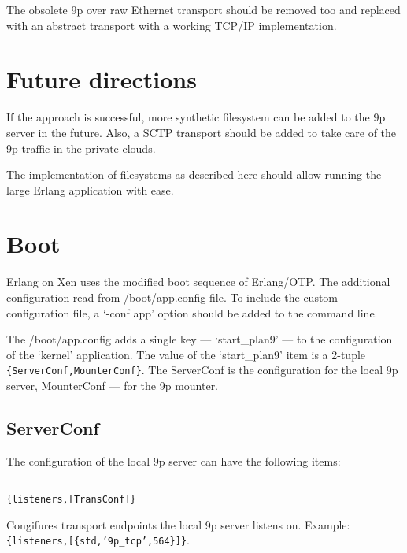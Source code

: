 The obsolete 9p over raw Ethernet transport should be removed too and replaced
with an abstract transport with a working TCP\slash IP implementation.

\chapter{Future directions}
\label{futuredirections}

If the approach is successful, more synthetic filesystem can be added to the 9p
server in the future. Also, a SCTP transport should be added to take care of the
9p traffic in the private clouds.

The implementation of filesystems as described here should allow running the
large Erlang application with ease.

\chapter{Boot}
\label{boot}

Erlang on Xen uses the modified boot sequence of Erlang\slash OTP. The additional
configuration read from \slash boot\slash app.config file. To include the custom
configuration file, a `-conf app' option should be added to the command line.

The \slash boot\slash app.config adds a single key --- `start\_plan9' --- to the
configuration of the `kernel' application. The value of the `start\_plan9' item
is a 2-tuple \texttt{\{ServerConf,MounterConf\}}. The ServerConf is the configuration for
the local 9p server, MounterConf --- for the 9p mounter.

\section{ServerConf}
\label{serverconf}

The configuration of the local 9p server can have the following items:

\begin{adjustwidth}{2.5em}{2.5em}
\begin{verbatim}

{listeners,[TransConf]}

\end{verbatim}
\end{adjustwidth}

Congifures transport endpoints the local 9p server listens on. Example:
\texttt{\{listeners,[\{std,'9p\_tcp',564\}]\}}.

